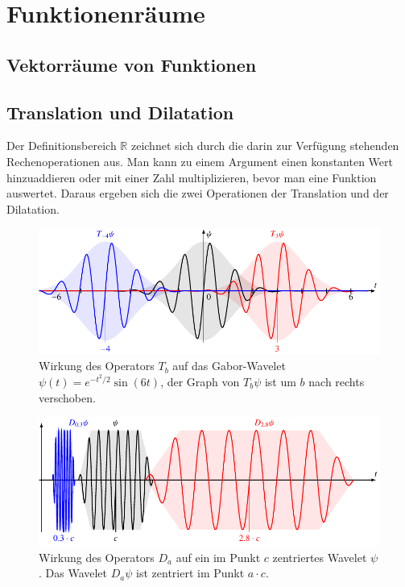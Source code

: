%
%
%
\section{Funktionenräume%
\label{section:funktionenraume}}

\subsection{Vektorräume von Funktionen}

\subsection{Translation und Dilatation}
Der Definitionsbereich $\mathbb R$ zeichnet sich durch die darin zur
Verfügung stehenden Rechenoperationen aus.
Man kann zu einem Argument einen konstanten Wert hinzuaddieren oder mit
einer Zahl multiplizieren, bevor man eine Funktion auswertet.
Daraus ergeben sich die zwei Operationen der Translation und der Dilatation.

\begin{figure}
\centering
\includegraphics[width=\hsize]{chapters/1-geometrie/images/translation.pdf}
\caption{Wirkung des Operators $T_b$ auf das Gabor-Wavelet
$\psi(t) = e^{-t^2/2}\sin(6t)$,
der Graph von $T_b\psi$ ist um $b$ nach rechts verschoben.
\label{geometrie:Tb:image}}
\end{figure}
\begin{figure}
\centering
\includegraphics[width=\hsize]{chapters/1-geometrie/images/dilatation.pdf}
\caption{Wirkung des Operators $D_a$ auf ein im Punkt $c$ zentriertes
Wavelet $\psi$. Das Wavelet $D_a\psi$ ist zentriert im Punkt $a\cdot c$.
\label{geometrie:Da:image}}
\end{figure}

